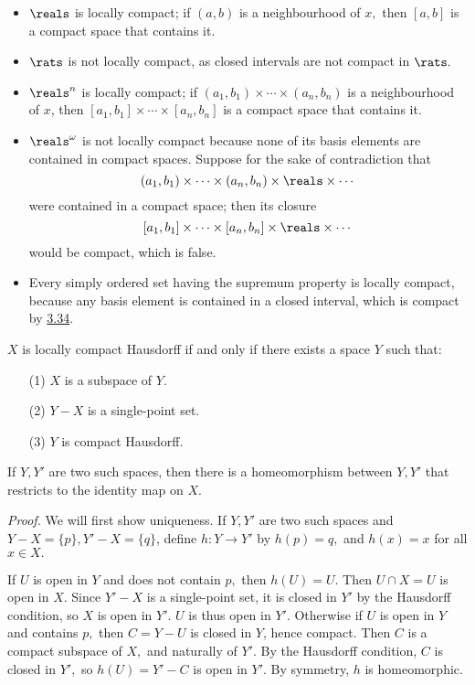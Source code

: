 \begin{itemize}
    \item $\reals$ is locally compact; if $(a, b)$ is a neighbourhood of $x,$ then $[a, b]$ is a compact space that contains it.
    \item $\rats$ is not locally compact, as closed intervals are not compact in $\rats.$
    \item $\reals^n$ is locally compact; if $(a_1, b_1) \times \cdots \times (a_n, b_n)$ is a neighbourhood of $x$, then $[a_1, b_1] \times \cdots \times [a_n, b_n]$ is a compact space that contains it.
    \item $\reals^\omega$ is not locally compact because none of its basis elements are contained in compact spaces. Suppose for the sake of contradiction that 
    $$(a_1, b_1) \times \cdots \times (a_n, b_n) \times \reals \times \cdots$$
    were contained in a compact space; then its closure
    $$[a_1, b_1] \times \cdots \times [a_n, b_n] \times \reals \times \cdots$$
    would be compact, which is false.
    \item Every simply ordered set having the supremum property is locally compact, because any basis element is contained in a closed interval, which is compact by \hyperref[3.34]{3.34}.
\end{itemize}
\begin{theorem}\label{3.50}
    $X$ is locally compact Hausdorff if and only if there exists a space $Y$ such that:
    \begin{enumerate}
        \item[(1)] $X$ is a subspace of $Y.$
        \item[(2)] $Y - X$ is a single-point set.
        \item[(3)] $Y$ is compact Hausdorff.
    \end{enumerate}
    If $Y, Y'$ are two such spaces, then there is a homeomorphism between $Y, Y'$ that restricts to the identity map on $X.$
\end{theorem}
{\it Proof.} We will first show uniqueness. If $Y, Y'$ are two such spaces and $Y-X = \{p\}, Y' -X = \{q\}$, define $h: Y \rightarrow Y'$ by $h(p) = q,$ and $h(x) = x$ for all $x \in X.$

If $U$ is open in $Y$ and does not contain $p,$ then $h(U) = U.$ Then $U \cap X = U$ is open in $X$. Since $Y'-X$ is a single-point set, it is closed in $Y'$ by the Hausdorff condition, so $X$ is open in $Y'$. $U$ is thus open in $Y'.$ Otherwise if $U$ is open in $Y$ and contains $p,$ then $C = Y-U$ is closed in $Y$, hence compact. Then $C$ is a compact subspace of $X,$ and naturally of $Y'.$ By the Hausdorff condition, $C$ is closed in $Y',$ so $h(U) = Y'-C$ is open in $Y'.$ By symmetry, $h$ is homeomorphic.

